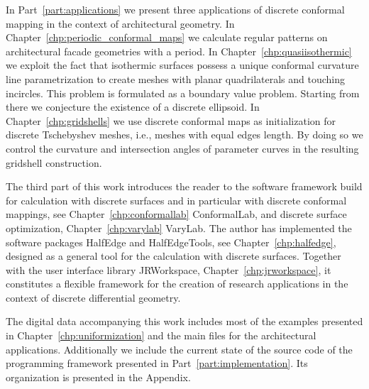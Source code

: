 \documentclass[Thesis.tex]{subfiles}
\begin{document}
In Part~\ref{part:applications} we present three applications of discrete conformal mapping in the context of architectural geometry. In Chapter~\ref{chp:periodic_conformal_maps} we calculate regular patterns on architectural facade geometries with a period. In Chapter~\ref{chp:quasiisothermic} we exploit the fact that isothermic surfaces possess a unique conformal curvature line parametrization to create meshes with planar quadrilaterals and touching incircles. This problem is formulated as a boundary value problem. Starting from there we conjecture the existence of a discrete ellipsoid. In Chapter~\ref{chp:gridshells} we use discrete conformal maps as initialization for discrete Tschebyshev meshes, i.e., meshes with equal edges length. By doing so we control the curvature and intersection angles of parameter curves in the resulting gridshell construction.

The third part of this work introduces the reader to the software framework build for calculation with discrete surfaces and in particular with discrete conformal mappings, see Chapter~\ref{chp:conformallab} {\sc ConformalLab}, and discrete surface optimization, Chapter~\ref{chp:varylab} {\sc VaryLab}. The author has implemented the software packages {\sc HalfEdge} and {\sc HalfEdgeTools}, see Chapter~\ref{chp:halfedge}, designed as a general tool for the calculation with discrete surfaces. Together with the user interface library {\sc JRWorkspace}, Chapter~\ref{chp:jrworkspace}, it constitutes a flexible framework for the creation of research applications in the context of discrete differential geometry. 

The digital data accompanying this work includes most of the examples presented in Chapter~\ref{chp:uniformization} and the main files for the architectural applications. Additionally we include the current state of the source code of the programming framework presented in Part~\ref{part:implementation}. Its organization is presented in the Appendix.

\subfilebibliography
\end{document}
